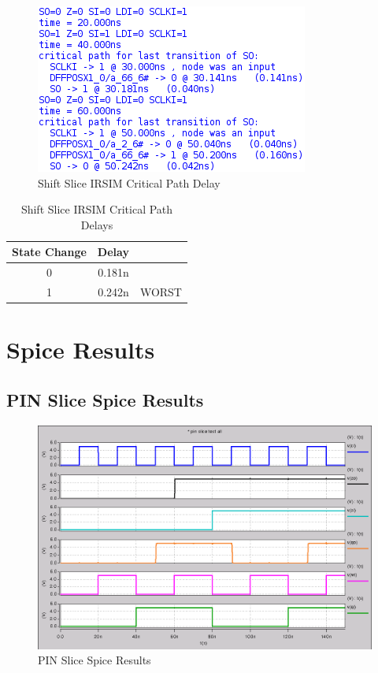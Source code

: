         \begin{figure}[H]
            \centering
            \includegraphics[]{../../irsim/shift_slice_timing.png}
            \caption{Shift Slice IRSIM Critical Path Delay}
        \end{figure}
        \begin{table}[H]
            \centering
            \begin{tabular}{crc}
                \toprule
                \textbf{State Change} & \textbf{Delay} & \\
                \midrule
                0 & 0.181n & \\
                1 & 0.242n & WORST \\
                \bottomrule
            \end{tabular}
            \caption{Shift Slice IRSIM Critical Path Delays}
        \end{table}


\newpage
\section{Spice Results}

    \subsection{PIN Slice Spice Results}
        
        \begin{figure}[H]
            \centering
            \includegraphics[width=0.75\linewidth]{../../spice/pin_slice_all.png}
            \caption{PIN Slice Spice Results}
        \end{figure}

